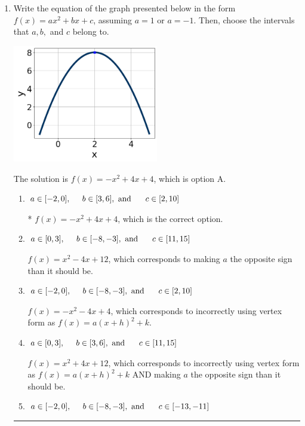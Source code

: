 \documentclass{extbook}[14pt]
\newcommand{\litem}[1]{\item #1

\rule{\textwidth}{0.4pt}}
\begin{document}
\begin{enumerate}\litem{
Write the equation of the graph presented below in the form $f(x)=ax^2+bx+c$, assuming  $a=1$ or $a=-1$. Then, choose the intervals that $a, b,$ and $c$ belong to.

\begin{center}
    \includegraphics[width=0.5\textwidth]{../Figures/quadraticGraphToEquationC.png}
\end{center}




The solution is \( f(x) = -x^{2} +4 x + 4 \), which is option A.\begin{enumerate}[label=\Alph*.]
\item \( a \in [-2, 0], \hspace*{5mm} b \in [3, 6], \text{ and } \hspace*{5mm} c \in [2, 10] \)

* $f(x)=-x^{2} +4 x + 4$, which is the correct option.
\item \( a \in [0, 3], \hspace*{5mm} b \in [-8, -3], \text{ and } \hspace*{5mm} c \in [11, 15] \)

$f(x)=x^{2} -4 x + 12$, which corresponds to making $a$ the opposite sign than it should be.
\item \( a \in [-2, 0], \hspace*{5mm} b \in [-8, -3], \text{ and } \hspace*{5mm} c \in [2, 10] \)

$f(x)=-x^{2} -4 x + 4$, which corresponds to incorrectly using vertex form as $f(x) = a(x+h)^2+k$.
\item \( a \in [0, 3], \hspace*{5mm} b \in [3, 6], \text{ and } \hspace*{5mm} c \in [11, 15] \)

$f(x)=x^{2} +4 x + 12$, which corresponds to incorrectly using vertex form as $f(x) = a(x+h)^2+k$ AND making $a$ the opposite sign than it should be.
\item \( a \in [-2, 0], \hspace*{5mm} b \in [-8, -3], \text{ and } \hspace*{5mm} c \in [-13, -11] \)


\end{enumerate}}
\end{enumerate}
\end{document}
